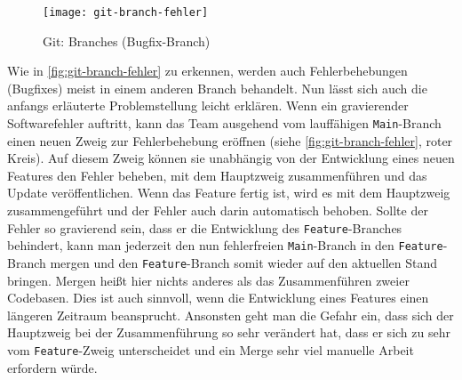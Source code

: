 \begin{figure}[H]
    \centering
    \texttt{[image: git-branch-fehler]}
    \caption{Git: Branches (Bugfix-Branch)}
    \label{fig:git-branch-fehler}
\end{figure}

Wie in \autoref{fig:git-branch-fehler} zu erkennen, werden auch Fehlerbehebungen
(Bugfixes) meist in einem anderen Branch behandelt. Nun lässt sich auch die
anfangs erläuterte Problemstellung leicht erklären. Wenn ein gravierender
Softwarefehler auftritt, kann das Team ausgehend vom lauffähigen
\texttt{Main}-Branch einen neuen Zweig zur Fehlerbehebung eröffnen (siehe
\autoref{fig:git-branch-fehler}, roter Kreis). Auf diesem Zweig können sie
unabhängig von der Entwicklung eines neuen Features den Fehler beheben, mit dem
Hauptzweig zusammenführen und das Update veröffentlichen. Wenn das Feature
fertig ist, wird es mit dem Hauptzweig zusammengeführt und der Fehler auch darin
automatisch behoben. Sollte der Fehler so gravierend sein, dass er die
Entwicklung des \texttt{Feature}-Branches behindert, kann man jederzeit den nun
fehlerfreien \texttt{Main}-Branch in den \texttt{Feature}-Branch mergen und den
\texttt{Feature}-Branch somit wieder auf den aktuellen Stand bringen. Mergen
heißt hier nichts anderes als das Zusammenführen zweier Codebasen. Dies ist auch
sinnvoll, wenn die Entwicklung eines Features einen längeren Zeitraum
beansprucht. Ansonsten geht man die Gefahr ein, dass sich der Hauptzweig bei der
Zusammenführung so sehr verändert hat, dass er sich zu sehr vom
\texttt{Feature}-Zweig unterscheidet und ein Merge sehr viel manuelle Arbeit
erfordern würde.
